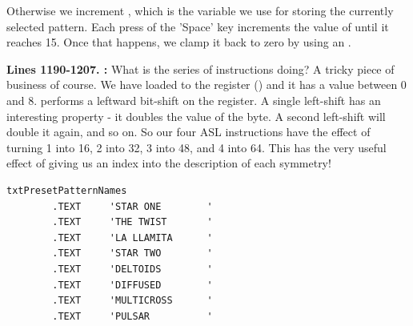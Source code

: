 Otherwise we increment , which is the variable we use for storing the currently selected pattern.
Each press of the 'Space' key increments the value of  until it reaches 15. Once that happens, we 
clamp it back to zero by using an .

\textbf{Lines 1190-1207. :} What is the series of  instructions doing? A tricky
piece of business of course. We have loaded  to the  register () and it has a value between 0 and 8.
 performs a leftward bit-shift on the  register. A single left-shift has an interesting property - it doubles the
value of the byte. A second left-shift will double it again, and so on. So our four {ASL} instructions have the effect of turning 1 into
16, 2 into 32, 3 into 48, and 4 into 64. This has the very useful effect of giving us an index into the description of each symmetry!

\begin{lstlisting}[escapechar=\%]
txtPresetPatternNames
        .TEXT     'STAR ONE        '
        .TEXT     'THE TWIST       '
        .TEXT     'LA LLAMITA      '
        .TEXT     'STAR TWO        '
        .TEXT     'DELTOIDS        '
        .TEXT     'DIFFUSED        '
        .TEXT     'MULTICROSS      '
        .TEXT     'PULSAR          '
\end{lstlisting}

